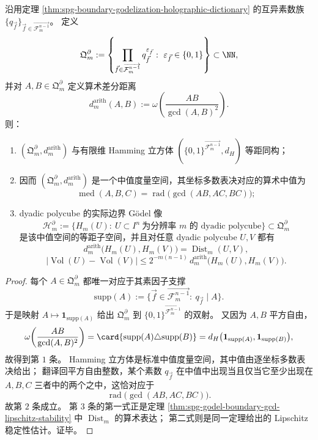 \begin{theorem}\label{thm:spg-boundary-godel-arithmetic-hypercube-median}
沿用定理 \ref{thm:spg-boundary-godelization-holographic-dictionary} 的互异素数族 \(\{q_{\vec f}\}_{\vec f\in \overrightarrow{\mathcal F_m^{n-1}}}\)。
定义
\[
\mathfrak Q_m^{\partial}
:=
\left\{
\prod_{\vec f\in\overrightarrow{\mathcal F_m^{n-1}}} q_{\vec f}^{\varepsilon_{\vec f}}:
\ \varepsilon_{\vec f}\in\{0,1\}
\right\}
\subset \NN,
\]
并对 \(A,B\in \mathfrak Q_m^{\partial}\) 定义算术差分距离
\[
d_m^{\mathrm{arith}}(A,B)
:=
\omega\!\left(\frac{AB}{\gcd(A,B)^2}\right).
\]
则：
\begin{enumerate}
  \item \((\mathfrak Q_m^{\partial},d_m^{\mathrm{arith}})\) 与有限维 Hamming 立方体 \((\{0,1\}^{\overrightarrow{\mathcal F_m^{n-1}}},d_H)\) 等距同构；
  \item 因而 \((\mathfrak Q_m^{\partial},d_m^{\mathrm{arith}})\) 是一个中值度量空间，其坐标多数表决对应的算术中值为
        \[
        \operatorname{med}(A,B,C)
        =
        \operatorname{rad}\!\bigl(\gcd(AB,AC,BC)\bigr);
        \]
  \item dyadic polycube 的实际边界 Gödel 像
        \[
        \mathcal H_m^{\partial}
        :=
        \{H_m(U):\ U\subset I^n\ \text{为分辨率 }m\text{ 的 dyadic polycube}\}
        \subset \mathfrak Q_m^{\partial}
        \]
        是该中值空间的等距子空间，并且对任意 dyadic polycube \(U,V\) 都有
        \[
        d_m^{\mathrm{arith}}\bigl(H_m(U),H_m(V)\bigr)=\operatorname{Dist}_m(U,V),
        \]
        \[
        \bigl|\operatorname{Vol}(U)-\operatorname{Vol}(V)\bigr|
        \le
        2^{-m(n-1)}\,
        d_m^{\mathrm{arith}}\bigl(H_m(U),H_m(V)\bigr).
        \]
\end{enumerate}
\end{theorem}
\begin{proof}
每个 \(A\in\mathfrak Q_m^{\partial}\) 都唯一对应于其素因子支撑
\[
\mathrm{supp}(A)
:=
\{\vec f\in \overrightarrow{\mathcal F_m^{n-1}}:\ q_{\vec f}\mid A\}.
\]
于是映射 \(A\mapsto \mathbf 1_{\mathrm{supp}(A)}\) 给出 \(\mathfrak Q_m^{\partial}\) 到 \(\{0,1\}^{\overrightarrow{\mathcal F_m^{n-1}}}\) 的双射。
又因为 \(A,B\) 平方自由，
\[
\omega\!\left(\frac{AB}{\gcd(A,B)^2}\right)
=
\card{\mathrm{supp}(A)\triangle \mathrm{supp}(B)}
=
d_H\bigl(\mathbf 1_{\mathrm{supp}(A)},\mathbf 1_{\mathrm{supp}(B)}\bigr),
\]
故得到第 \(1\) 条。
Hamming 立方体是标准中值度量空间，其中值由逐坐标多数表决给出；
翻译回平方自由整数，某个素数 \(q_{\vec f}\) 在中值中出现当且仅当它至少出现在 \(A,B,C\) 三者中的两个之中，这恰对应于
\[
\operatorname{rad}\!\bigl(\gcd(AB,AC,BC)\bigr).
\]
故第 \(2\) 条成立。
第 \(3\) 条的第一式正是定理 \ref{thm:spg-godel-boundary-gcd-lipschitz-stability} 中 \(\operatorname{Dist}_m\) 的算术表达；
第二式则是同一定理给出的 Lipschitz 稳定性估计。证毕。
\end{proof}

